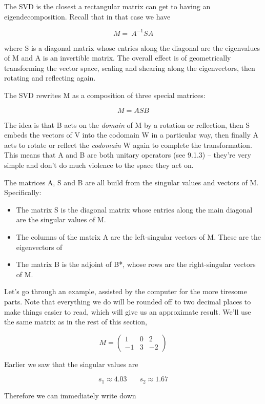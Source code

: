 \documentclass[oneside,english]{amsbook}
\numberwithin{section}{chapter}
\theoremstyle{plain}
\theoremstyle{definition}
\begin{document}
The SVD is the closest a rectangular matrix can get to having an
eigendecomposition. Recall that in that case we have

\[M = \ A^{- 1}SA\]

where S is a diagonal matrix whose entries along the diagonal are the
eigenvalues of M and A is an invertible matrix. The overall effect is of
geometrically transforming the vector space, scaling and shearing along
the eigenvectors, then rotating and reflecting again.

The SVD rewrites M as a composition of three special matrices:

\[M = ASB\]

The idea is that B acts on the \emph{domain} of M by a rotation or
reflection, then S embeds the vectors of V into the codomain W in a
particular way, then finally A acts to rotate or reflect the
\emph{codomain} W again to complete the transformation. This means that
A and B are both unitary operators (see 9.1.3) -- they're very simple
and don't do much violence to the space they act on.

The matrices A, S and B are all build from the singular values and
vectors of M. Specifically:

\begin{itemize}
	\item
	The matrix S is the diagonal matrix whose entries along the main
	diagonal are the singular values of M.
	\item
	The columns of the matrix A are the left-singular vectors of M. These
	are the eigenvectors of
	\item
	The matrix B is the adjoint of B*, whose rows are the right-singular
	vectors of M.
\end{itemize}

Let's go through an example, assisted by the computer for the more
tiresome parts. Note that everything we do will be rounded off to two
decimal places to make things easier to read, which will give us an
approximate result. We'll use the same matrix as in the rest of this
section,

\[M = \begin{pmatrix}
	1 & 0 & 2 \\
	- 1 & 3 & - 2
\end{pmatrix}\]

Earlier we saw that the singular values are

\[s_{1} \approx 4.03\ \ \ \ \ \ \ \ s_{2} \approx 1.67\]

Therefore we can immediately write down
\end{document}
